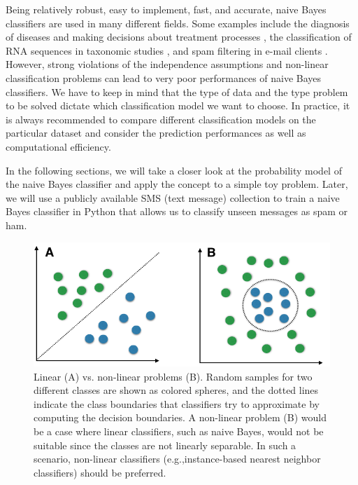 \documentclass{article}
\begin{document}
Being relatively robust, easy to implement, fast, and accurate, naive Bayes classifiers are used in many different fields. Some examples include the diagnosis of diseases and making decisions about treatment processes \cite{kazmierska2008application}, the classification of RNA sequences in taxonomic studies \cite{wang2007naive}, and spam filtering in e-mail clients \cite{sahami1998bayesian}.  
However, strong violations of the independence assumptions and non-linear classification problems can lead to very poor performances of naive Bayes classifiers.  
We have to keep in mind that the type of data and the type problem to be solved dictate which classification model we want to choose. In practice, it is always recommended to compare different classification models on the particular dataset and consider the prediction performances as well as computational efficiency. 

In the following sections, we will take a closer look at the probability model of the naive Bayes classifier and apply the concept to a simple toy problem. Later, we will use a publicly available SMS (text message) collection to train a naive Bayes classifier in Python that allows us to classify unseen messages as spam or ham.

\begin{figure}[h!]
\includegraphics[width=\linewidth]{../images/linear_vs_nonlinear_problems.png}
\caption{Linear (A) vs. non-linear problems (B). Random samples for two different classes are shown as colored spheres, and the dotted lines indicate the class boundaries that classifiers try to approximate by computing the decision boundaries.
A non-linear problem (B) would be a case where linear classifiers, such as naive Bayes, would not be suitable since the classes are not linearly separable. In such a scenario, non-linear classifiers (e.g.,instance-based nearest neighbor classifiers) should be preferred.}
\label{fig:nonlinear_probs}
\end{figure}
\end{document}
